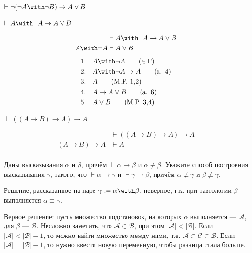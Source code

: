 \begin{exercise}[4.b]
\end{exercise}

\begin{exercise}[4.c]
    \(\vdash \neg (\neg A \with \neg B) \to A \lor B\)
\end{exercise}

\begin{exercise}[4.d]
    \(\vdash A \with \neg A \to A \lor B\)

    \begin{align*}
                       & \vdash A \with \neg A \to A \lor B \\
        A \with \neg A & \vdash A \lor B
    \end{align*}
    \begin{align*}
        1.\quad & A \with \neg A \tag{\(\in\Gamma\)} \\
        2.\quad & A \with \neg A \to A \tag{a. 4}    \\
        3.\quad & A \tag{M.P. 1,2}                   \\
        4.\quad & A \to A \lor B \tag{a. 6}          \\
        5.\quad & A \lor B \tag{M.P. 3,4}            \\
    \end{align*}
\end{exercise}

\begin{exercise}[4.e]
    \(\vdash ((A \to B) \to A) \to A\)

    \begin{align*}
                        & \vdash ((A \to B) \to A) \to A \\
        (A \to B) \to A & \vdash A                       \\
    \end{align*}
\end{exercise}

\begin{exercise}[5]
    Даны высказывания $\alpha$ и $\beta$, причём $\vdash \alpha\rightarrow\beta$ и $\alpha\not\equiv\beta$.
    Укажите способ построения высказывания $\gamma$, такого, что
    $\vdash\alpha\rightarrow\gamma$ и $\vdash\gamma\rightarrow\beta$, причём $\alpha\not\equiv\gamma$ и
    $\beta\not\equiv\gamma$.

    Решение, рассказанное на паре \(\gamma : = \alpha \with \beta\), неверное, т.к. при тавтологии \(\beta\) выполняется \(\alpha \equiv \gamma\).

    Верное решение: пусть множество подстановок, на которых \(\alpha\) выполняется --- \(\mathcal{A}\), для \(\beta\) --- \(\mathcal{B}\). Несложно заметить, что \(\mathcal{A}\subset \mathcal{B}\), при этом \(|\mathcal{A}| < |\mathcal{B}|\). Если \(|\mathcal{A}| < |\mathcal{B}| - 1\), то можно найти множество между ними, т.е. \(\mathcal{A}\subset \mathcal{C}\subset \mathcal{B}\). Если \(|\mathcal{A}| = |\mathcal{B}| - 1\), то нужно ввести новую переменную, чтобы разница стала больше.
\end{exercise}

